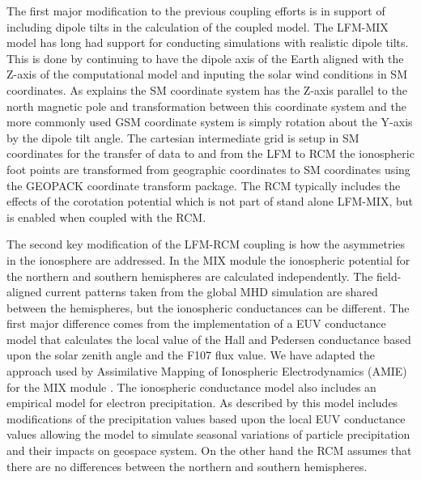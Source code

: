 \documentclass[draft,jgrga]{agutex}
\begin{document}
\begin{article}
The first major modification to the previous coupling efforts is in support of including dipole tilts in the calculation of the coupled model.  The LFM-MIX model has long had support for conducting simulations with realistic dipole tilts.  This is done by continuing to have the dipole axis of the Earth aligned with the Z-axis of the computational model and inputing the solar wind conditions in SM coordinates.  As \cite{1992P&SS...40..711H} explains the SM coordinate system has the Z-axis parallel to the north magnetic pole and transformation between this coordinate system and the more commonly used GSM coordinate system is simply rotation about the Y-axis by the dipole tilt angle.   The cartesian intermediate grid is setup in SM coordinates for the transfer of data to and from the LFM to RCM the ionospheric foot points are transformed from geographic coordinates to SM coordinates using the GEOPACK coordinate transform package.    The RCM typically includes the effects of the corotation potential which is not part of stand alone LFM-MIX, but is enabled when coupled with the RCM. 

The second key modification of the LFM-RCM coupling is how the asymmetries in the ionosphere are addressed.  In the MIX module the ionospheric potential for the northern and southern hemispheres are calculated independently.  The field-aligned current patterns taken from the global MHD simulation are shared between the hemispheres, but the ionospheric conductances can be different.  The first major difference comes from the implementation of a EUV conductance model that calculates the local value of the Hall and Pedersen conductance based upon the solar zenith angle and the F107 flux value.  We have adapted the approach used by Assimilative Mapping of Ionospheric Electrodynamics  (AMIE) for the MIX module \citep{1992AdSpR..12...59R}.  The ionospheric conductance model also includes an empirical model for electron precipitation.  As described by \cite{2009JGRA..11401204W} this model includes modifications of the precipitation values based upon the local EUV conductance values allowing the model to simulate seasonal variations of particle precipitation and their impacts on geospace system.  On the other hand the RCM assumes that there are no differences between the northern and southern hemispheres.  


\end{article}
\end{document}
